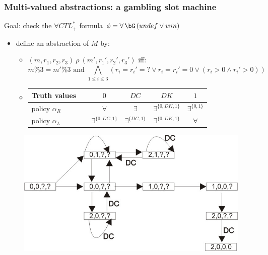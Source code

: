 \begin{frame}
\frametitle{Multi-valued abstractions: a gambling slot machine}

Goal: check the $\forall CTL^*_+$ formula 
\alert{$\phi=\forall\,\bG\,(undef\vee win)$}

\begin{itemize}
	\item define an abstraction of $M$ by:
	\begin{itemize}
		\item \alert{$(m,r_1,r_2,r_3)\ \rho\ (m',r_1',r_2',r_3')$} iff:
		\[
		m\%3=m'\%3\mbox{ and }\bigwedge_{1\leq i\leq 3}(r_i=r_i'=?\vee 
		r_i=r_i'=0\vee (r_i>0\wedge r_i'>0))
		\]
		\item 
		\begin{tabular}[t]{l|c|c|c|c}
		Truth values\ \ & $0$ & $DC$ & $DK$ & $1$ \\ [1mm]\hline
		\alert{policy $\alpha_R$} & $\forall$ & $\exists$ & 
		        $\exists^{\{0,DK,1\}}$ & $\exists^{\{0,1\}}$ \\ [1mm]\hline
		\alert{policy $\alpha_L$} & $\exists^{\{0,DC,1\}}$ & 
		        $\exists^{\{DC,1\}}$ & $\exists^{\{0,DK,1\}}$ & $\forall$ 
		\end{tabular}
	\end{itemize}
\end{itemize}

\vspace{-3mm}
\begin{figure}[t]
	\centering
		\includegraphics{figures/abstraction.jpg}
\end{figure}
\end{frame}

